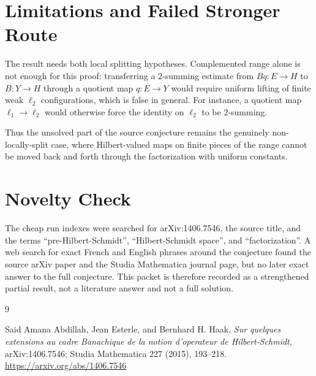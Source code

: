 \documentclass[11pt]{amsart}
\begin{document}
\section*{Limitations and Failed Stronger Route}

The result needs both local splitting hypotheses. Complemented range
alone is not enough for this proof: transferring a $2$-summing estimate
from $Bq:E\to H$ to $B:Y\to H$ through a quotient map $q:E\to Y$ would
require uniform lifting of finite weak $\ell_2$ configurations, which is
false in general. For instance, a quotient map $\ell_1\to\ell_2$ would
otherwise force the identity on $\ell_2$ to be $2$-summing.

Thus the unsolved part of the source conjecture remains the genuinely
non-locally-split case, where Hilbert-valued maps on finite pieces of
the range cannot be moved back and forth through the factorization with
uniform constants.

\section*{Novelty Check}

The cheap run indexes were searched for arXiv:1406.7546, the source
title, and the terms ``pre-Hilbert-Schmidt'', ``Hilbert-Schmidt
space'', and ``factorization''. A web search for exact French and
English phrases around the conjecture found the source arXiv paper and
the Studia Mathematica journal page, but no later exact answer to the
full conjecture. This packet is therefore recorded as a strengthened
partial result, not a literature answer and not a full solution.

\begin{thebibliography}{9}

Said Amana Abdillah, Jean Esterle, and Bernhard H. Haak,
\emph{Sur quelques extensions au cadre Banachique de la notion
d'operateur de Hilbert-Schmidt},
arXiv:1406.7546; Studia Mathematica 227 (2015), 193--218.
\url{https://arxiv.org/abs/1406.7546}

\end{thebibliography}
\end{document}
